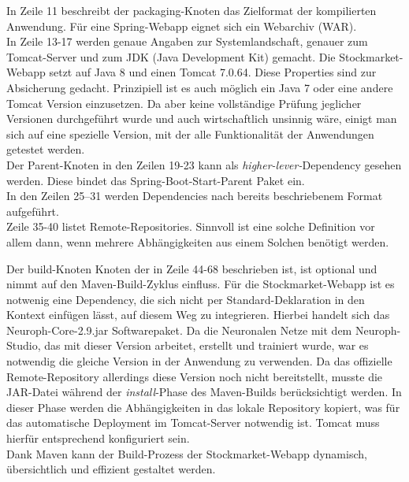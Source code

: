 In Zeile 11 beschreibt der packaging-Knoten das Zielformat der kompilierten Anwendung. Für eine Spring-Webapp eignet sich ein Webarchiv (WAR).\\ 

In Zeile 13-17 werden genaue Angaben zur Systemlandschaft, genauer zum Tomcat-Server und zum JDK (Java Development Kit) gemacht. Die Stockmarket-Webapp setzt auf Java 8 und einen Tomcat 7.0.64.
Diese Properties sind zur Absicherung gedacht. Prinzipiell ist es auch möglich ein Java 7 oder eine andere Tomcat Version einzusetzen. Da aber keine vollständige Prüfung jeglicher Versionen durchgeführt wurde und auch wirtschaftlich unsinnig wäre, einigt man sich auf eine spezielle Version, mit der alle Funktionalität der Anwendungen getestet werden.\\

Der Parent-Knoten in den Zeilen 19-23 kann als \emph{higher-lever-}Dependency gesehen werden. Diese bindet das Spring-Boot-Start-Parent Paket ein.\\

In den Zeilen 25--31 werden Dependencies nach bereits beschriebenem Format aufgeführt.\\

Zeile 35-40 listet Remote-Repositories. Sinnvoll ist eine solche Definition vor allem dann, wenn mehrere Abhängigkeiten aus einem Solchen benötigt werden. 

Der build-Knoten Knoten der in Zeile 44-68 beschrieben ist, ist optional und nimmt auf den Maven-Build-Zyklus einfluss. Für die Stockmarket-Webapp ist es notwenig eine Dependency, die sich nicht per Standard-Deklaration in den Kontext einfügen lässt, auf diesem Weg zu integrieren. Hierbei handelt sich das Neuroph-Core-2.9.jar Softwarepaket. Da die Neuronalen Netze mit dem Neuroph-Studio, das mit dieser Version arbeitet, erstellt und trainiert wurde, war es notwendig die gleiche Version in der Anwendung zu verwenden. Da das offizielle Remote-Repository allerdings diese Version noch nicht bereitstellt, musste die JAR-Datei während der \emph{install}-Phase des Maven-Builds berücksichtigt werden. In dieser Phase werden die Abhängigkeiten in das lokale Repository kopiert, was für das automatische Deployment im Tomcat-Server notwendig ist. Tomcat muss hierfür entsprechend konfiguriert sein.\\
Dank Maven kann der Build-Prozess der Stockmarket-Webapp dynamisch, übersichtlich und effizient gestaltet werden.   

